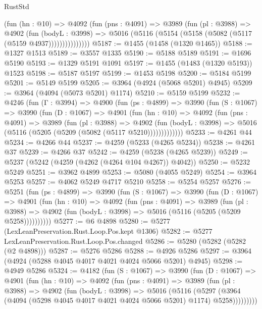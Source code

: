 \begin{lexlean}{RustStd}
\begin{coremodule}
              (fun (hn : @10) =>
              @4092
                (fun (pns : @4091) =>
                @3989
                  (fun (pl : @3988) =>
                  @4902
                    (fun (bodyL : @3998) =>
                    @5016 (@5116 (@5154 (@5158 (@5082 (@5117 (@5159 @4937)))))))))))))))
@5187 := @1455 (@1458 (@1320 @1465))
@5188 := @1327 @1513
@5189 := @3557 @1335
@5190 := @5188 @5189
@5191 := @1696 @5190
@5193 := @1329 @5191 @1091
@5197 := @1455 (@1483 (@1320 @5193)) @1523
@5198 := @5187 @5197
@5199 := @1453 @5198
@5200 := @5184 @5199
@5201 := @5149 @5199
@5205 := @3964 (@4924 (@5068 @5201) @4945)
@5209 := @3964 (@4094 (@5073 @5201) @1174)
@5210 := @5159 @5199
@5232 := @4246
    (fun (Γ : @3994) =>
    @4900
      (fun (ps : @4899) =>
      @3990
        (fun (S : @1067) =>
        @3990
          (fun (D : @1067) =>
          @4901
            (fun (hn : @10) =>
            @4092
              (fun (pns : @4091) =>
              @3989
                (fun (pl : @3988) =>
                @4902
                  (fun (bodyL : @3998) =>
                  @5016 (@5116 (@5205 (@5209 (@5082 (@5117 @5210)))))))))))))
@5233 := @4261 @44
@5234 := @4266 @44
@5237 := @4259 (@5233 (@4265 @5234))
@5238 := @4261 @37
@5239 := @4266 @37
@5242 := @4259 (@5238 (@4265 @5239))
@5249 := @5237 (@5242 (@4259 (@4262 (@4264 @104 @4267)) @4042))
@5250 := @5232 @5249
@5251 := @3962 @4899
@5253 := @5080 (@4055 @5249)
@5254 := @3964 @5253
@5257 := @4062 @5249 @4717 @5210
@5258 := @5254 @5257
@5276 := @5251
    (fun (ps : @4899) =>
    @3990
      (fun (S : @1067) =>
      @3990
        (fun (D : @1067) =>
        @4901
          (fun (hn : @10) =>
          @4092
            (fun (pns : @4091) =>
            @3989
              (fun (pl : @3988) =>
              @4902 (fun (bodyL : @3998) => @5016 (@5116 (@5205 (@5209 @5258))))))))))
@5277 := @6 @4898
@5280 := @5277 (LexLeanPreservation.Rust.Loop.Pos.kept @1306)
@5282 := @5277 LexLeanPreservation.Rust.Loop.Pos.changed
@5286 := @5280 (@5282 (@5282 (@2 @4898)))
@5287 := @5276 @5286
@5288 := @4926 @5286
@5297 := @3964 (@4924 (@5288 @4045 @4017 @4021 @4024 @5066 @5201) @4945)
@5298 := @4949 @5286
@5324 := @4182
    (fun (S : @1067) =>
    @3990
      (fun (D : @1067) =>
      @4901
        (fun (hn : @10) =>
        @4092
          (fun (pns : @4091) =>
          @3989
            (fun (pl : @3988) =>
            @4902
              (fun (bodyL : @3998) =>
              @5016
                (@5116
                  (@5297
                    (@3964 (@4094 (@5298 @4045 @4017 @4021 @4024 @5066 @5201) @1174) @5258)))))))))

\end{coremodule}
\end{lexlean}
